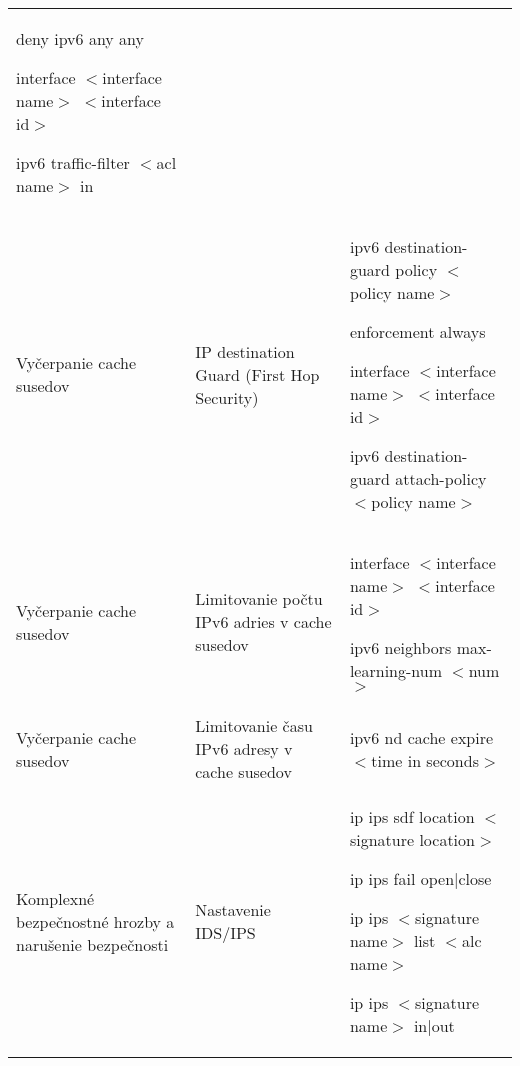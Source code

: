 \begin{longtable}[!htbp]{|L{10em}L{10em}>{\selectfont}L{34em}|}
	\hspace{0.5em}deny ipv6 any any 
	
	interface $<$interface name$>$ $<$interface id$>$
	
	\hspace{0.5em}ipv6 traffic-filter $<$acl name$>$ in\\
	
	
	
	
	 Vyčerpanie cache susedov	&IP destination Guard (First Hop Security)
	
	
	&ipv6 destination-guard policy $<$policy name$>$
	
	\hspace{0.5em}enforcement always
	
	interface $<$interface name$>$ $<$interface id$>$
	
	\hspace{0.5em}ipv6 destination-guard attach-policy $<$policy name$>$\\
	
	
	
	
	Vyčerpanie cache susedov	&Limitovanie počtu IPv6 adries v cache susedov	&interface $<$interface name$>$ $<$interface id$>$
	
	\hspace{0.5em}ipv6 neighbors max-learning-num $<$num$>$\\
	
	
	
	 Vyčerpanie cache susedov	&Limitovanie času IPv6 adresy v cache susedov	&ipv6 nd cache expire $<$time in seconds$>$\\
	
	
	
	Komplexné bezpečnostné hrozby a narušenie bezpečnosti	&Nastavenie IDS/IPS	&ip ips sdf location $<$signature location$>$
	
	ip ips fail  open|close
	
	ip ips $<$signature name$>$ list $<$alc name$>$
	
	ip ips $<$signature name$>$ in|out\\
	
	
	\hline
	
\end{longtable}%



\restoregeometry
\normalsize


